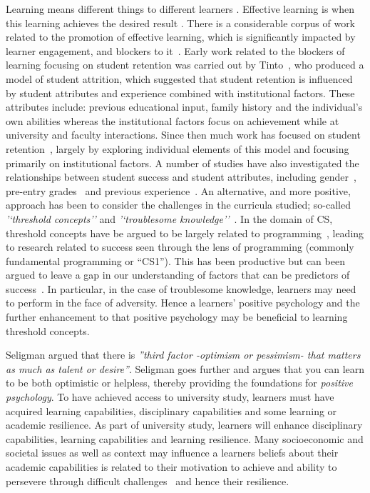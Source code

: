\documentclass[sigconf]{acmart}
\begin{document}
Learning means different things to different learners \cite{saljo1979learning, Ramsden1992}. Effective learning is when this learning achieves the desired result \cite{kolb2014}. There is a considerable corpus of work related to the promotion of effective learning, which is significantly impacted by learner engagement, and blockers to it~\cite{kolb2014, Ramsden1992}. Early work related to the blockers of learning focusing on student retention was carried out by Tinto~\cite{Tinto1975}, who produced a model of student attrition, which suggested that student retention is influenced by student attributes and experience combined with institutional factors. These attributes include: previous educational input, family history and the individual's own abilities whereas the institutional factors focus on achievement while at university and faculty interactions. Since then much work has focused on student retention~\cite{Barbera2017,Chen2012}, largely by exploring individual elements of this model and focusing primarily on institutional factors. A number of studies have also investigated the relationships between student success and student attributes, including gender~\cite{Lishinski:2016:LPG:2960310.2960329}, pre-entry grades~\cite{Peterson1979} and previous experience~\cite{Ramalingam:2004:SMM:1026487.1008042}. An alternative, and more positive, approach has been to consider the challenges in the curricula studied; so-called {\em'`threshold concepts''} and {\em'`troublesome knowledge''}~\cite{Land2012}. In the domain of CS, threshold concepts have be argued to be largely related to programming~\cite{Sanders:2016:TCC:2999541.2999546}, leading to research related to success seen through the lens of programming (commonly fundamental programming or ``CS1''). This has been productive but can been argued to leave a gap in our understanding of factors that can be predictors of success~\cite{Liao:2019:RML:3308443.3277569,Castro-Wunsch:2017:ENN:3017680.3017792,Quille:2018:PPS:3197091.3197101}. In particular, in the case of troublesome knowledge, learners may need to perform in the face of adversity. Hence a learners' positive psychology and the further enhancement to that positive psychology may be beneficial to learning threshold concepts.

Seligman argued that there is {\em''third factor -optimism or pessimism- that matters as much as talent or desire''}\cite[p.~13]{Seligman90}. Seligman goes further and argues that you can learn to be both optimistic or helpless, thereby providing the foundations for {\em positive psychology}. To have achieved access to university study, learners must have acquired learning capabilities, disciplinary capabilities and some learning or academic resilience. As part of university study, learners will enhance disciplinary capabilities, learning capabilities and learning resilience.  Many socioeconomic and societal issues as well as context may influence a learners beliefs about their academic capabilities is related to their motivation to achieve and ability to persevere through difficult challenges~\cite{ZIMMERMAN200082,Bandura1977} and hence their resilience. 
 
\end{document}
